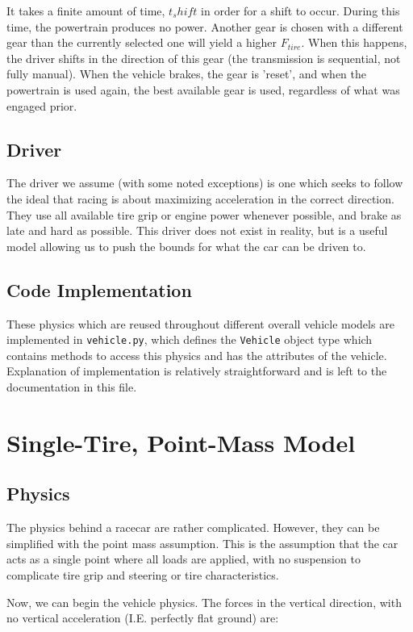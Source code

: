 \documentclass{article}
\begin{document}
It takes a finite amount of time, $t_shift$ in order for a shift to occur. During this time, the powertrain produces no power. Another gear is chosen with a different gear than the currently selected one will yield a higher $F_{tire}$. When this happens, the driver shifts in the direction of this gear (the transmission is sequential, not fully manual). When the vehicle brakes, the gear is 'reset', and when the powertrain is used again, the best available gear is used, regardless of what was engaged prior.

\subsection{Driver}

The driver we assume (with some noted exceptions) is one which seeks to follow the ideal that racing is about maximizing acceleration in the correct direction. They use all available tire grip or engine power whenever possible, and brake as late and hard as possible. This driver does not exist in reality, but is a useful model allowing us to push the bounds for what the car can be driven to.

\subsection{Code Implementation}
These physics which are reused throughout different overall vehicle models are implemented in \texttt{vehicle.py}, which defines the \texttt{Vehicle} object type which contains methods to access this physics and has the attributes of the vehicle. Explanation of implementation is relatively straightforward and is left to the documentation in this file.

\section{Single-Tire, Point-Mass Model}

\subsection{Physics}

The physics behind a racecar are rather complicated. However, they can be simplified with the point mass assumption. This is the assumption that the car acts as a single point where all loads are applied, with no suspension to complicate tire grip and steering or tire characteristics.

Now, we can begin the vehicle physics. The forces in the vertical direction, with no vertical acceleration (I.E. perfectly flat ground) are:
\end{document}
